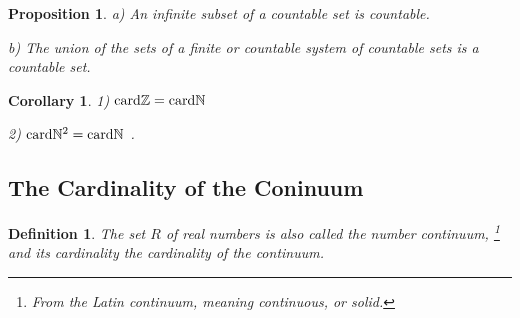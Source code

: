 \documentclass[a4paper,12pt]{article} %
\newtheorem{definition}{Definition}[section]
\newtheorem{proposition}{Proposition}[section]
\newtheorem{corollary}[theorem]{Corollary}
\begin{document}
\begin{proposition}
    a) An infinite subset of a countable set is countable.

    b) The union of the sets of a finite or countable system of countable 
    sets is a countable set.
\end{proposition}

\begin{corollary}
    1) ${\rm card} \mathbb{Z} = {\rm card} \mathbb{N}$
    
    2) ${\rm card} \mathbb{N}^2 = {\rm card} \mathbb{N}$ .
\end{corollary}

\subsection{The Cardinality of the Coninuum}
\begin{definition}
    The set $R$ of real numbers is also called the number continuum, 
    \footnote{From the Latin continuum, meaning continuous, or solid.}
    and its cardinality the cardinality of the continuum.
\end{definition}
\end{document}
